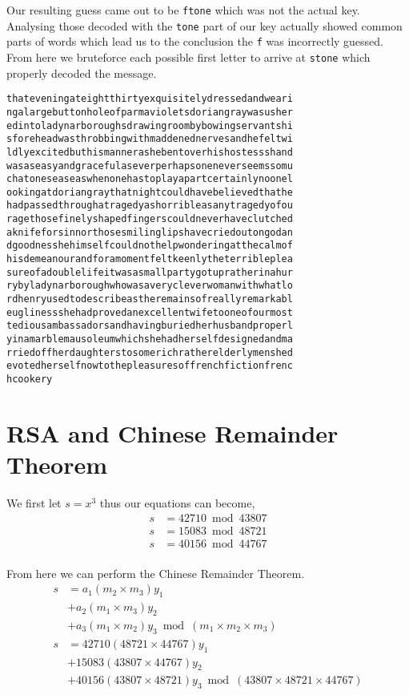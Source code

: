 \documentclass{article}
\begin{document}
Our resulting guess came out to be \texttt{ftone} which was not the actual key.
Analysing those decoded with the \texttt{tone} part of our key actually showed
common parts of words which lead us to the conclusion the \texttt{f} was
incorrectly guessed. From here we bruteforce each possible first letter to
arrive at \texttt{stone} which properly decoded the message.
\begin{verbatim}
thateveningateightthirtyexquisitelydressedandweari
ngalargebuttonholeofparmavioletsdoriangraywasusher
edintoladynarboroughsdrawingroombybowingservantshi
sforeheadwasthrobbingwithmaddenednervesandhefeltwi
ldlyexcitedbuthismannerashebentoverhishostessshand
wasaseasyandgracefulaseverperhapsoneneverseemssomu
chatoneseaseaswhenonehastoplayapartcertainlynoonel
ookingatdoriangraythatnightcouldhavebelievedthathe
hadpassedthroughatragedyashorribleasanytragedyofou
ragethosefinelyshapedfingerscouldneverhaveclutched
aknifeforsinnorthosesmilinglipshavecriedoutongodan
dgoodnesshehimselfcouldnothelpwonderingatthecalmof
hisdemeanourandforamomentfeltkeenlytheterribleplea
sureofadoublelifeitwasasmallpartygotupratherinahur
rybyladynarboroughwhowasaverycleverwomanwithwhatlo
rdhenryusedtodescribeastheremainsofreallyremarkabl
euglinessshehadprovedanexcellentwifetooneofourmost
tediousambassadorsandhavingburiedherhusbandproperl
yinamarblemausoleumwhichshehadherselfdesignedandma
rriedoffherdaughterstosomerichratherelderlymenshed
evotedherselfnowtothepleasuresoffrenchfictionfrenc
hcookery
\end{verbatim}

\section{RSA and Chinese Remainder Theorem}
We first let $s = x^3$ thus our equations can become,
\begin{align*}
    s &= 42710 \bmod 43807 \\
    s &= 15083 \bmod 48721 \\
    s &= 40156 \bmod 44767 \\
\end{align*}

From here we can perform the Chinese Remainder Theorem.
\begin{align*}
    s &= a_1 (m_2 \times m_3) y_1 \\
      &+ a_2 (m_1 \times m_3) y_2 \\
      &+ a_3 (m_1 \times m_2) y_3 \bmod (m_1 \times m_2 \times m_3) \\
    s &= 42710 (48721 \times 44767) y_1 \\
      &+ 15083 (43807 \times 44767) y_2 \\
      &+ 40156 (43807 \times 48721) y_3 \bmod (43807 \times 48721 \times 44767)
\end{align*}
\end{document}
